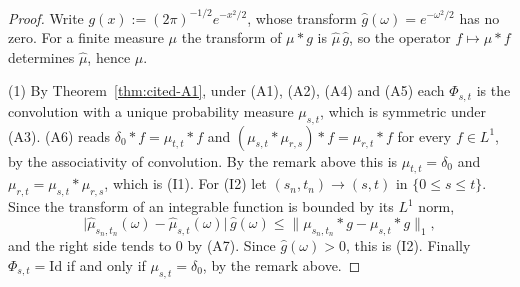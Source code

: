 \begin{proof}
\leanok
{}
Write $g(x) := (2\pi)^{-1/2}e^{-x^2/2}$, whose transform $\widehat g(\omega) = e^{-\omega^2/2}$
has no zero. For a finite measure $\mu$ the transform of $\mu * g$ is $\widehat\mu\,\widehat g$,
so the operator $f \mapsto \mu * f$ determines $\widehat\mu$, hence $\mu$.

(1) By Theorem~\ref{thm:cited-A1}, under (A1), (A2), (A4) and (A5) each
$\Phi_{s,t}$ is the convolution with a unique probability measure $\mu_{s,t}$, which is
symmetric under (A3). (A6) reads $\delta_0 * f = \mu_{t,t} * f$ and
$(\mu_{s,t} * \mu_{r,s}) * f = \mu_{r,t} * f$ for every $f \in L^1$, by the associativity of
convolution. By the remark above this is $\mu_{t,t} = \delta_0$ and
$\mu_{r,t} = \mu_{s,t} * \mu_{r,s}$, which is (I1). For (I2) let $(s_n,t_n) \to (s,t)$ in
$\{0 \le s \le t\}$. Since the transform of an integrable function is bounded by its $L^1$ norm,
\[
  \bigl|\widehat\mu_{s_n,t_n}(\omega) - \widehat\mu_{s,t}(\omega)\bigr|\,\widehat g(\omega)
  \le \bigl\|\mu_{s_n,t_n} * g - \mu_{s,t} * g\bigr\|_1 ,
\]
and the right side tends to $0$ by (A7). Since $\widehat g(\omega) > 0$, this is (I2). Finally
$\Phi_{s,t} = \mathrm{Id}$ if and only if $\mu_{s,t} = \delta_0$, by the remark above.


\end{proof}
